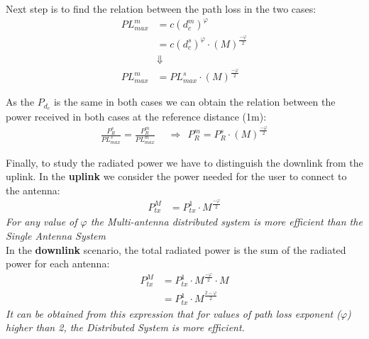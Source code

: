Next step is to find the relation between the path loss in the two cases:
\begin{align*}
PL^m_{max} &= c(d^m_c) ^{\varphi} \\
	&= c(d^s_c)^{\varphi}\cdot (M)^{\frac{-\varphi}{2}}\\ %
&\Downarrow\\	
	PL^m_{max} &= PL^s_{max} \cdot (M)^{\frac{-\varphi}{2}}
\end{align*}

As the $P_{d_{c}}$ is the same in both cases we can obtain the relation between the power received in both cases at the reference distance (1m):
\begin{align*}
\frac{P^s_R}{PL^s_{max}}=\frac{P^m_R}{PL^m_{max}}\ \ &\Longrightarrow \ \ P^m_R = P^s_R \cdot (M)^{\frac{-\varphi}{2}}
\end{align*}

Finally, to study the radiated power we have to distinguish the downlink from the uplink. In the \textbf{uplink} we consider the power needed for the user to connect to the antenna:
\begin{align*}
P^M_{tx} &= P^1_{tx} \cdot M^{\frac{-\varphi}{2}}
\end{align*}
\textit{For any value of $\varphi$ the Multi-antenna distributed system is more efficient than the Single Antenna System}\\

In the \textbf{downlink} scenario, the total radiated power is the sum of the radiated power for each antenna:
\begin{align*}
P^M_{tx} &= P^1_{tx} \cdot M^{\frac{-\varphi}{2}} \cdot M\\
&=P^1_{tx} \cdot M^{\frac{2-\varphi}{2}}
\end{align*}
\textit{It can be obtained from this expression that for values of path loss exponent ($\varphi$) higher than 2, the Distributed System is more efficient.}